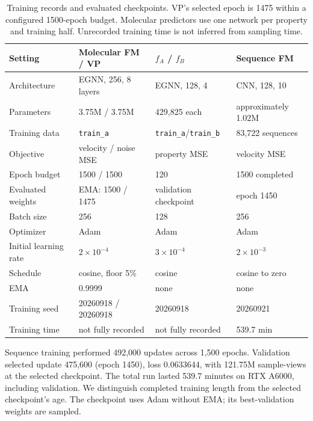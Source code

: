 \documentclass{article}
\begin{document}
\begin{table}[!htbp]
\centering\small
\caption{Training records and evaluated checkpoints. VP's selected epoch is 1475 within a configured 1500-epoch budget. Molecular predictors use one network per property and training half. Unrecorded training time is not inferred from sampling time.}
\label{tab:training}
\begin{tabular}{llll}
\toprule
Setting & Molecular FM / VP & $f_A$ / $f_B$ & Sequence FM\\
\midrule
Architecture & EGNN, 256, 8 layers & EGNN, 128, 4 & CNN, 128, 10\\
Parameters & 3.75M / 3.75M & 429,825 each & approximately 1.02M\\
Training data & \texttt{train\_a} & \texttt{train\_a}/\texttt{train\_b} & 83,722 sequences\\
Objective & velocity / noise MSE & property MSE & velocity MSE\\
Epoch budget & 1500 / 1500 & 120 & 1500 completed\\
Evaluated weights & EMA: 1500 / 1475 & validation checkpoint & epoch 1450\\
Batch size & 256 & 128 & 256\\
Optimizer & Adam & Adam & Adam\\
Initial learning rate & $2\times10^{-4}$ & $3\times10^{-4}$ & $2\times10^{-3}$\\
Schedule & cosine, floor 5\% & cosine & cosine to zero\\
EMA & 0.9999 & none & none\\
Training seed & 20260918 / 20260918 & 20260918 & 20260921\\
Training time & not fully recorded & not fully recorded & 539.7 min\\
\bottomrule
\end{tabular}
\end{table}

Sequence training performed 492,000 updates across 1,500 epochs. Validation selected update 475,600 (epoch 1450), loss 0.0633644, with 121.75M sample-views at the selected checkpoint. The total run lasted 539.7 minutes on RTX A6000, including validation. We distinguish completed training length from the selected checkpoint's age. The checkpoint uses Adam without EMA; its best-validation weights are sampled.
\end{document}
